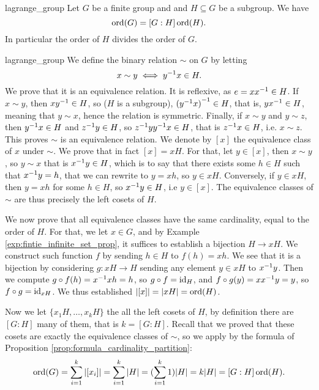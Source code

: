 \begin{cthm}{}{lagrange_group}
    Let \( G \) be a finite group and and \( H \subseteq G \) be a subgroup. We have
    \begin{equation*}
        \operatorname{ord}(G) = [G : H]\operatorname{ord}(H).
    \end{equation*} 
    In particular the order of \( H \) divides the order of \( G \).
\end{cthm}
\begin{thmproof}{lagrange_group}
    We define the binary relation \( \sim \) on \( G \) by letting
    \begin{equation*}
        x \sim y \iff {y}^{-1} x \in H.
    \end{equation*}
    We prove that it is an equivalence relation. It is reflexive, as \( e = x{x}^{-1} \in H \). If \( x \sim y \), then \( x{y}^{-1} \in H \), so (\( H \) is a subgroup), \( {({y}^{-1} x)}^{-1} \in H \), that is, \( y {x}^{-1} \in H \), meaning that \( y \sim x \), hence the relation is symmetric. Finally, if \( x \sim y \) and \( y \sim z \), then \( {y}^{-1} x \in H \) and \( {z}^{-1} y \in H \), so \( {z}^{-1} y {y}^{-1} x \in H \), that is \( {z}^{-1} x \in H \), i.e. \( x \sim z \). This proves \( \sim \) is an equivalence relation. We denote by \( [x] \) the equivalence class of \( x \) under \( \sim \). We prove that in fact \( [x] = xH \). For that, let \( y \in [x] \), then \( x \sim y \), so \( y \sim x \) that is \( {x}^{-1} y \in H \), which is to say that there exists some \( h \in H \) such that \( {x}^{-1} y = h \), that we can rewrite to \( y = x h \), so \( y \in xH \). Conversely, if \( y \in xH \), then \( y = xh \) for some \( h \in H \), so \( {x}^{-1} y \in H \), i.e \( y \in [x] \). The equivalence classes of \( \sim \) are thus precisely the left cosets of \( H \).

    We now prove that all equivalence classes have the same cardinality, equal to the order of \( H \). For that, we let \( x \in G \), and  by Example \ref{exp:fintie_infinite_set_prop}, it suffices to establish a bijection \( H \to xH \). We construct such function \( f \) by sending \( h \in H \) to \( f(h) = x h \). We see that it is a bijection by considering \( g : xH \to H \) sending any element \( y \in x H \) to \( {x}^{-1} y \). Then we compute \( g \circ f (h) = {x}^{-1} x h = h \), so \( g \circ f = \mathrm{id}_H \), and \( f \circ g (y) = x {x}^{-1} y = y \), so \( f \circ g = \mathrm{id}_{xH} \). We thus established \( |[x]| = |xH| = \operatorname{ord}(H) \). 
    
    Now we let \( \{ x_1H, \dots, x_kH \} \) the all the left cosets of \( H \), by definition there are \( [G : H ] \) many of them, that is \( k = [G : H] \). Recall that we proved that these cosets are exactly the equivalence classes of \( \sim \), so we apply by the formula of Proposition \ref{prop:formula_cardinality_partition}:
    \begin{equation*}
        \operatorname{ord}(G) = \sum\limits_{i = 1}^k |[x_i]| = \sum\limits_{i = 1}^k |H| = (\sum\limits_{i = 1}^k 1)|H| = k |H| = [G : H] \operatorname{ord}(H).
    \end{equation*}
\end{thmproof}

